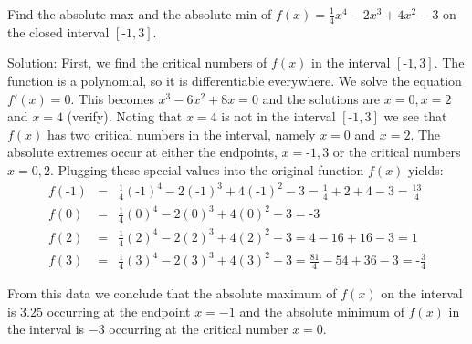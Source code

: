 \documentclass[handout]{ximera}
\begin{document}
\begin{example}[example 3] Find the absolute max and the absolute min of $f(x) = \frac14 x^4 - 2x^3 + 4x^2 - 3$ on the 
closed interval $[\text{-}1, 3]$.


Solution:  First, we find the critical numbers of $f(x)$ in the interval $[\text{-}1, 3]$. 
The function is a polynomial, so it is differentiable everywhere.  
We solve the equation $f'(x) =0$.  This becomes $x^3 -6x^2 + 8x = 0$ and the solutions are $x=0, x=2$ and $x=4$ (verify). 
Noting that $x = 4$ is not in the interval $[\text{-}1,3]$ we see that 
$f(x)$ has two critical numbers in the interval, namely $x = 0$ and $x = 2$.
The absolute extremes occur at either the endpoints, $x=\text{-}1, 3$ or the critical numbers $x = 0,2$.  
Plugging these special values into the original function $f(x)$ yields:
\begin{eqnarray*}
f(\text{-}1) &=& \frac14(\text{-}1)^4 -2(\text{-}1)^3 + 4(\text{-}1)^2 - 3 = \frac14 + 2 + 4 - 3 = \frac{13}{4}\\
f(0) &=& \frac14 (0)^4 -2(0)^3 + 4(0)^2 - 3 = \text{-}3\\
f(2) &=& \frac14(2)^4 -2(2)^3 + 4(2)^2 - 3 = 4 -16 + 16 -3 = 1\\
f(3) &=& \frac14(3)^4 -2(3)^3 + 4(3)^2 - 3 = \frac{81}{4} - 54 + 36 - 3 = \text{-}\frac34
\end{eqnarray*}


From this data we conclude that the absolute maximum of $f(x)$ on the interval is $3.25$ occurring 
at the endpoint $x = -1$ and the absolute minimum of $f(x)$ in the interval is $-3$
occurring at the critical number $x = 0$.
\begin{image}
\end{image}
\end{example}
\end{document}
